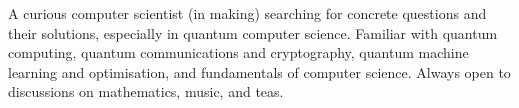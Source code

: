 

\begin{cvparagraph}


A curious computer scientist (in making) searching for concrete questions and their solutions, especially in quantum computer science. Familiar with quantum computing, quantum communications and cryptography, quantum machine learning and optimisation, and fundamentals of computer science. Always open to discussions on mathematics, music, and teas.

\end{cvparagraph}
